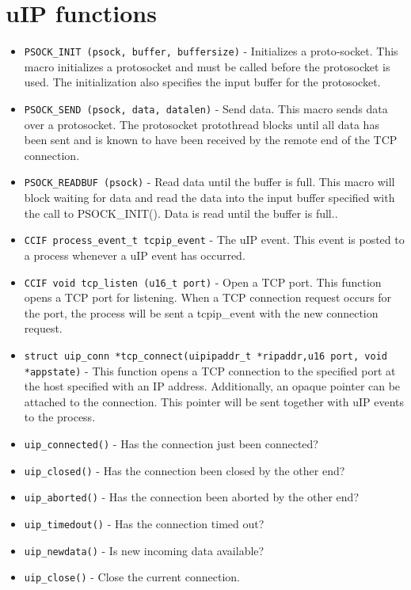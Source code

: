 \section{uIP functions}
\begin{itemize}
 \item \texttt{PSOCK\_INIT (psock, buffer, buffersize)} -  Initializes a proto-socket.
This macro initializes a protosocket and must be called before the protosocket is used. The initialization also 
specifies the input buffer for the protosocket.
\item \texttt{PSOCK\_SEND (psock, data, datalen)} - Send data.
This macro sends data over a protosocket. The protosocket protothread blocks until all data has been 
sent and is known to have been received by the remote end of the TCP connection.
\item \texttt{PSOCK\_READBUF (psock)} - Read data until the buffer is full.
This macro will block waiting for data and read the data into the input buffer specified with the call to 
PSOCK\_INIT(). Data is read until the buffer is full..
\item \texttt{CCIF process\_event\_t tcpip\_event} - The uIP event.
This event is posted to a process whenever a uIP event has occurred. 
\item \texttt{CCIF void tcp\_listen (u16\_t port)} - Open a TCP port.
This function opens a TCP port for listening. When a TCP connection request occurs for the port, 
the process will be sent a tcpip\_event with the new connection request.
\item \texttt{struct uip\_conn *tcp\_connect(uipipaddr\_t *ripaddr,u16 port, 
void *appstate)} - This function opens a TCP connection to the specified port at the host specified with an IP address. 
Additionally, 
an opaque pointer can be attached to the connection. This pointer will be sent together with uIP events to the process.
\item \texttt{uip\_connected()} - Has the connection just been connected? 
\item \texttt{uip\_closed()} - Has the connection been closed by the other end? 
\item \texttt{uip\_aborted()} - Has the connection been aborted by the other end? 
\item \texttt{uip\_timedout()} - Has the connection timed out? 
\item \texttt{uip\_newdata()} - Is new incoming data available? 
\item \texttt{uip\_close()} -  Close the current connection. 
\end{itemize}

